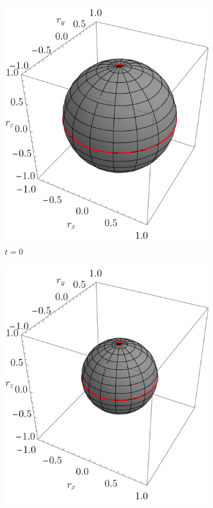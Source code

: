 \begin{figure}[ht!]
  \centering
  \begin{subfigure}{0.32\textwidth}
    \centering
    \includegraphics[width=0.9\linewidth]{chapter3/figures_toy/SWAP_t=0._p=0.9_r=0.9.png}
    \caption{$t=0$}
  \end{subfigure}%
  \begin{subfigure}{0.32\textwidth}
    \centering
    \includegraphics[width=0.9\linewidth]{chapter3/figures_toy/SWAP_t=0.5_p=0.9_r=0.9.png}

\end{subfigure}
\end{figure}
